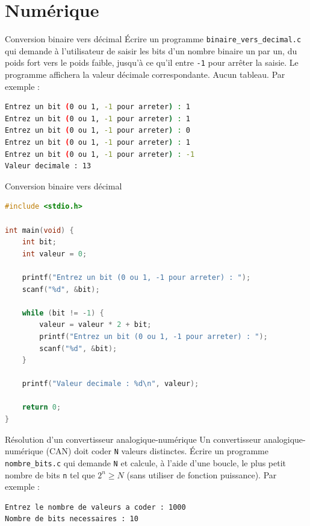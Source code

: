 \section{Numérique}

\begin{UPSTIexercice}{Conversion binaire vers décimal}
	\UPSTIetape Écrire un programme \texttt{binaire\_vers\_decimal.c} qui demande à l'utilisateur de saisir les bits d'un nombre binaire un par un, du poids fort vers le poids faible, jusqu'à ce qu'il entre \texttt{-1} pour arrêter la saisie. Le programme affichera la valeur décimale correspondante. Aucun tableau.
	Par exemple :
	\begin{lstlisting}[language=bash,style=console]
Entrez un bit (0 ou 1, -1 pour arreter) : 1
Entrez un bit (0 ou 1, -1 pour arreter) : 1
Entrez un bit (0 ou 1, -1 pour arreter) : 0
Entrez un bit (0 ou 1, -1 pour arreter) : 1
Entrez un bit (0 ou 1, -1 pour arreter) : -1
Valeur decimale : 13
\end{lstlisting}
\end{UPSTIexercice}

\begin{UPSTIcorrectionP}{Conversion binaire vers décimal}
	\begin{lstlisting}[language=c]
#include <stdio.h>

int main(void) {
    int bit;
    int valeur = 0;

    printf("Entrez un bit (0 ou 1, -1 pour arreter) : ");
    scanf("%d", &bit);

    while (bit != -1) {
        valeur = valeur * 2 + bit;
        printf("Entrez un bit (0 ou 1, -1 pour arreter) : ");
        scanf("%d", &bit);
    }

    printf("Valeur decimale : %d\n", valeur);

    return 0;
}
	\end{lstlisting}
\end{UPSTIcorrectionP}

\begin{UPSTIexercice}{Résolution d'un convertisseur analogique-numérique}
	\UPSTIetape Un convertisseur analogique-numérique (CAN) doit coder \texttt{N} valeurs distinctes. Écrire un programme \texttt{nombre\_bits.c} qui demande \texttt{N} et calcule, à l'aide d'une boucle, le plus petit nombre de bits \texttt{n} tel que $2^n \geq N$ (sans utiliser de fonction puissance).
	Par exemple :
	\begin{lstlisting}[language=bash,style=console]
Entrez le nombre de valeurs a coder : 1000
Nombre de bits necessaires : 10
\end{lstlisting}
\end{UPSTIexercice}

